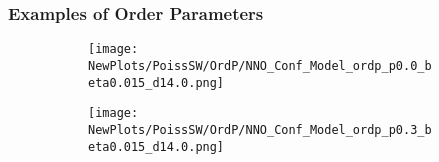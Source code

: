 \documentclass[xcolor={dvipsnames}]{beamer}
\begin{document}
\begin{frame}
	\frametitle{Examples of Order Parameters}
	\begin{figure}[t]
		\begin{subfigure}[t]{0.54\linewidth}
			\vspace{-.5cm}
			\centering
			\texttt{[image: NewPlots/PoissSW/OrdP/NNO\_Conf\_Model\_ordp\_p0.0\_beta0.015\_d14.0.png]} 
			\label{fig:Ordp_OPSW_COVID19_D14}
		\end{subfigure}
		\begin{subfigure}[t]{0.54\linewidth}
			\vspace{-0.5cm}
			\centering
			\texttt{[image: NewPlots/PoissSW/OrdP/NNO\_Conf\_Model\_ordp\_p0.3\_beta0.015\_d14.0.png]}
			\label{fig:Ordp_OPSW_highmu_COVID19}
		\end{subfigure}
		\label{fig:Ordp_OPSW_COVID19_panel}
	\end{figure}
\end{frame}
\end{document}
